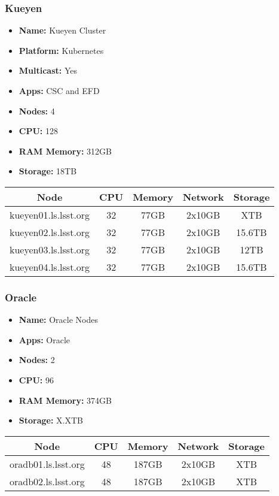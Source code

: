 \newpage
\subsubsection{Kueyen}
\begin{itemize}
  \itemsep0em 
  \item \textbf{Name:}       Kueyen Cluster
  \item \textbf{Platform:}   Kubernetes
  \item \textbf{Multicast:}  Yes
  \item \textbf{Apps:}       CSC and EFD
  \item \textbf{Nodes:}      4
  \item \textbf{CPU:}        128
  \item \textbf{RAM Memory:} 312GB
  \item \textbf{Storage:}   18TB
\end{itemize}
\begin{center}
  \small
  \begin{tabular}{||c c c c c||}
    \hline
    \textbf{Node} & \textbf{CPU} & \textbf{Memory} & \textbf{Network} & \textbf{Storage} \\ [0.5ex]
    \hline
    kueyen01.ls.lsst.org & 32 & 77GB & 2x10GB & XTB \\
    \hline
    kueyen02.ls.lsst.org & 32 & 77GB & 2x10GB & 15.6TB \\
    \hline
    kueyen03.ls.lsst.org & 32 & 77GB & 2x10GB & 12TB \\
    \hline
    kueyen04.ls.lsst.org & 32 & 77GB & 2x10GB & 15.6TB \\
    \hline
  \end{tabular}
\end{center}

\subsubsection{Oracle}
\begin{itemize}
  \itemsep0em 
  \item \textbf{Name:}       Oracle Nodes
  \item \textbf{Apps:}       Oracle
  \item \textbf{Nodes:}      2
  \item \textbf{CPU:}        96
  \item \textbf{RAM Memory:} 374GB
  \item \textbf{Storage:}   X.XTB
\end{itemize}
\begin{center}
  \small
  \begin{tabular}{||c c c c c||} 
    \hline
    \textbf{Node} & \textbf{CPU} & \textbf{Memory} & \textbf{Network} & \textbf{Storage} \\ [0.5ex] 
    \hline
    oradb01.ls.lsst.org & 48 & 187GB & 2x10GB & XTB \\
    \hline
    oradb02.ls.lsst.org & 48 & 187GB & 2x10GB & XTB \\
    \hline
  \end{tabular}
\end{center}


